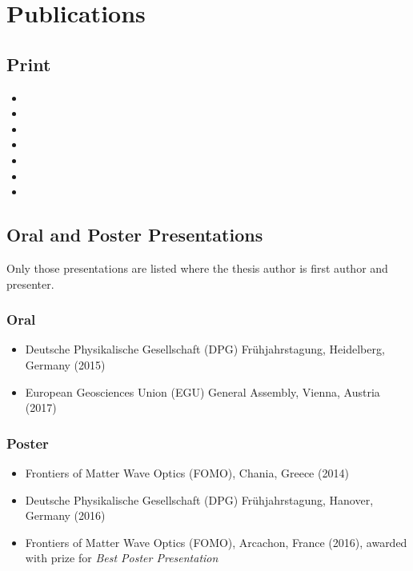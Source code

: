 \chapter*{Publications}\label{app:publications}

\begin{refsection}

	\section*{Print}
	\begin{itemize}
		\item {}
		\item {}
		\item {}
		\item {}
		\item {}
		\item {}
		\item {}
	\end{itemize}

	\section*{Oral and Poster Presentations}
	Only those presentations are listed where the thesis author is first  author and presenter.
	\subsection*{Oral}
	\begin{itemize}
		\item \textgerman{Deutsche Physikalische Gesellschaft (DPG) Frühjahrstagung}, Heidelberg, Germany (2015)
		\item European Geosciences Union (EGU) General Assembly, Vienna, Austria (2017)
	\end{itemize}
	\subsection*{Poster}
	\begin{itemize}
		\item Frontiers of Matter Wave Optics (FOMO), Chania, Greece (2014)
		\item \textgerman{Deutsche Physikalische Gesellschaft (DPG) Frühjahrstagung}, Hanover, Germany (2016)
		\item Frontiers of Matter Wave Optics (FOMO), Arcachon, France (2016), awarded with prize for \emph{Best Poster Presentation}
	\end{itemize}

\end{refsection}